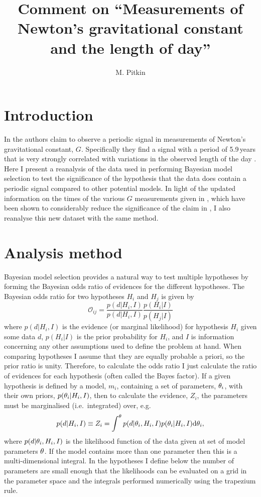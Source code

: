 \documentclass[page-classic]{epl2}
\title{Comment on ``Measurements of Newton's gravitational constant and the length of day''}
\author{M. Pitkin}
\institute{
  SUPA, School of Physics \& Astronomy, University of Glasgow, Glasgow, G12 8QQ, UK
}
\begin{document}
\maketitle

\section{Introduction}

In \cite{2015EL....11010002A} the authors claim to observe a periodic signal in measurements of
Newton's gravitational constant, $G$. Specifically they find a signal with a period of 5.9\,years that
is very strongly correlated with variations in the observed length of the day
\cite{2013Natur.499..202H}. Here I present a reanalysis of the data used in \cite{2015EL....11010002A}
performing Bayesian model selection to test the significance of the hypothesis that the data does contain
a periodic signal compared to other potential models. In light of the updated information on the times
of the various $G$ measurements given in \cite{2015arXiv150501774S}, which have been shown to considerably
reduce the significance of the claim in \cite{2015EL....11010002A}, I also reanalyse this new dataset with
the same method.

\section{Analysis method}

Bayesian model selection provides a natural way to test multiple hypotheses by forming the Bayesian odds ratio of
evidences for the different hypotheses. The Bayesian odds ratio for two hypotheses $H_i$ and $H_j$ is given by
\begin{equation}
 \mathcal{O}_{ij} = \frac{p(d|H_i,I)}{p(d|H_i,I)}\frac{p(H_i|I)}{p(H_j|I)}
\end{equation}
where $p(d|H_i,I)$ is the evidence (or marginal likelihood) for hypothesis $H_i$ given some data $d$,
$p(H_i|I)$ is the prior probability for $H_i$, and $I$ is information concerning any other assumptions used to
define the problem at hand. When comparing hypotheses I assume that they are equally
probable a priori, so the prior ratio is unity. Therefore, to calculate the odds ratio I just calculate
the ratio of evidences for each hypothesis (often called the Bayes factor). If a given hypothesis is defined
by a model, $m_i$, containing a set of parameters, $\mathbf{\theta}_i$, with their own priors,
$p(\mathbf{\theta}_i|H_i,I)$, then to calculate the evidence, $Z_i$, the parameters must be marginalised (i.e.\ integrated)
over, e.g.
\begin{equation}\label{eq:evidence}
 p(d|H_i,I) \equiv Z_i = \int^{\mathbf{\theta}} p(d|\mathbf{\theta}_i,H_i,I) p(\mathbf{\theta}_i|H_i,I) {\rm d}\mathbf{\theta}_i,
\end{equation}
where $p(d|\mathbf{\theta}_i,H_i,I)$ is the likelihood function of the data given at set of model parameters $\mathbf{\theta}$. If
the model contains more than one parameter then this is a multi-dimensional integral. In the hypotheses I define
below the number of parameters are small enough that the likelihoods can be evaluated on a grid in the parameter
space and the integrals performed numerically using the trapezium rule.
\end{document}
